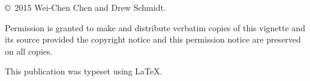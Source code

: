 
\null
\vfill
\copyright\ 2015 Wei-Chen Chen and Drew Schmidt.

Permission is granted to make and distribute verbatim copies of
this vignette and its source provided the copyright notice and
this permission notice are preserved on all copies.

This publication was typeset using \LaTeX.
